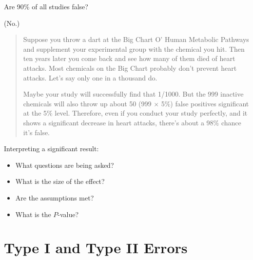 \begin{frame}{Are 90\% of all studies false?}

        (No.)

    \vspace{2em}
    \pause

    \begin{quote}
        \small
        Suppose you throw a dart at the Big Chart O' Human Metabolic Pathways and supplement your experimental group with the chemical you hit. Then ten years later you come back and see how many of them died of heart attacks.
        Most chemicals on the Big Chart probably don't prevent heart attacks. Let's say only one in a thousand do. 

    \vspace{1em}
        
        \pause Maybe your study will successfully find that 1/1000. But the 999 inactive chemicals will also throw up about 50 (999 $\times$ 5\%) false positives significant at the 5\% level. Therefore, even if you conduct your study perfectly, and it shows a significant decrease in heart attacks, there's about a 98\% chance it's false.
    \end{quote}


\end{frame}

\begin{frame}{Interpreting a significant result:}

    \begin{itemize}
        \item What questions are being asked?
        \item What is the size of the effect?
        \item Are the assumptions met?
        \item What is the $P$-value?
    \end{itemize}

\end{frame}

\section{Type I and Type II Errors}


